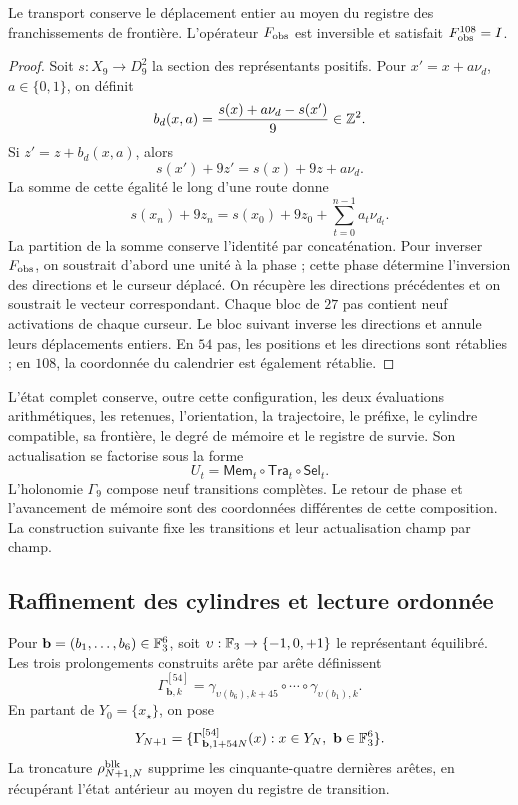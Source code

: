 \begin{proposition}
\label{hmtfg:transporte-calendario}
Le transport conserve le déplacement entier au moyen du registre des franchissements de frontière. L’opérateur \(F_{\rm obs}\) est inversible et satisfait
\(F_{\rm obs}^{108}=I\).
\end{proposition}
\begin{proof}
Soit \(s:X_9\to D_9^2\) la section des représentants positifs. Pour
\(x'=x+a\nu_d\), \(a\in\{0,1\}\), on définit
\[
 b_d(x,a)=\frac{s(x)+a\nu_d-s(x')}{9}\in\mathbb Z^2.
\]
Si \(z'=z+b_d(x,a)\), alors
\[
 s(x')+9z'=s(x)+9z+a\nu_d.
\]
La somme de cette égalité le long d’une route donne
\[
 s(x_n)+9z_n=s(x_0)+9z_0+\sum_{t=0}^{n-1}a_t\nu_{d_t}.
\]
La partition de la somme conserve l’identité par concaténation. Pour inverser \(F_{\rm obs}\), on soustrait d’abord une unité à la phase ; cette phase détermine l’inversion des directions et le curseur déplacé. On récupère les directions précédentes et on soustrait le vecteur correspondant. Chaque bloc de \(27\) pas contient neuf activations de chaque curseur. Le bloc suivant inverse les directions et annule leurs déplacements entiers. En \(54\) pas, les positions et les directions sont rétablies ; en \(108\), la coordonnée du calendrier est également rétablie.
\end{proof}

L’état complet conserve, outre cette configuration, les deux évaluations arithmétiques, les retenues, l’orientation, la trajectoire, le préfixe, le cylindre compatible, sa frontière, le degré de mémoire et le registre de survie. Son actualisation se factorise sous la forme
\[
 U_t=\mathsf{Mem}_t\circ\mathsf{Tra}_t\circ\mathsf{Sel}_t.
\]
L’holonomie \(\Gamma_9\) compose neuf transitions complètes. Le retour de phase et l’avancement de mémoire sont des coordonnées différentes de cette composition. La construction suivante fixe les transitions et leur actualisation champ par champ.



\subsection{Raffinement des cylindres et lecture ordonnée}
\label{hmtfg:refinamiento-ordenado}

Pour \(\mathbf b=(b_1,\ldots,b_6)\in\mathbb F_3^6\), soit
\(\upsilon:\mathbb F_3\to\{-1,0,+1\}\) le représentant équilibré. Les trois prolongements construits arête par arête définissent
\[
 \Gamma^{[54]}_{\mathbf b,k}
 =\gamma_{\upsilon(b_6),k+45}\circ\cdots\circ
   \gamma_{\upsilon(b_1),k}.
\]
En partant de \(Y_0=\{x_\star\}\), on pose
\[
 Y_{N+1}
 =\{\Gamma^{[54]}_{\mathbf b,1+54N}(x):
          x\in Y_N,\ \mathbf b\in\mathbb F_3^6\}.
\]
La troncature \(\rho^{\rm blk}_{N+1,N}\) supprime les cinquante-quatre dernières arêtes, en récupérant l’état antérieur au moyen du registre de transition.

